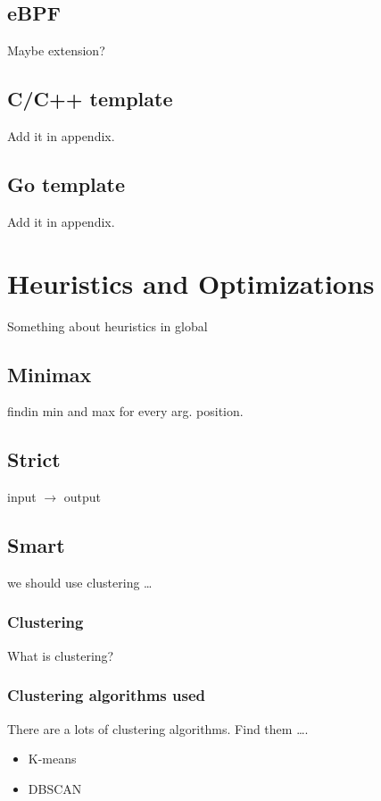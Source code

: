 \subsection{eBPF}
Maybe extension?
\subsection{C/C++ template}
Add it in appendix.
\subsection{Go template}
Add it in appendix.

\section{Heuristics and Optimizations}
Something about heuristics in global
\subsection{Minimax}
findin min and max for every arg. position.
\subsection{Strict}
input $\rightarrow$ output
\subsection{Smart}
we should use clustering \ldots
\subsubsection{Clustering}
What is clustering?
\subsubsection{Clustering algorithms used}
There are a lots of clustering algorithms. Find them \ldots.
\begin{itemize}
	\item{K-means}
	\item{DBSCAN\cite{Mahesh_Kumar2016}}
\end{itemize}



